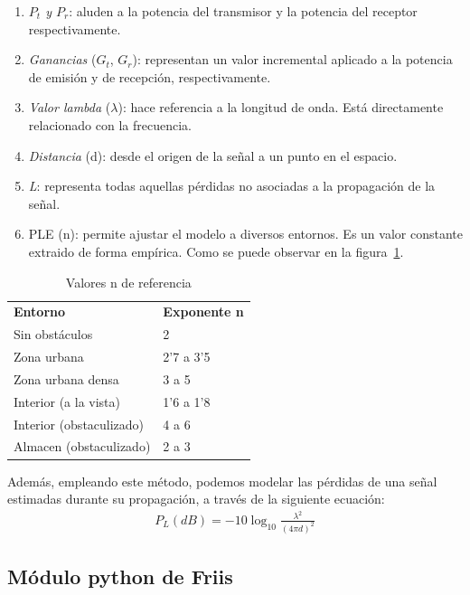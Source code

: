 \begin{enumerate}
    \item \emph{$P_t$ y $P_r$}: aluden a la potencia del transmisor y la potencia del receptor respectivamente.
    \item \emph{Ganancias} ($G_t$, $G_r$): representan un valor incremental aplicado a la potencia de emisión y de recepción, respectivamente.
    \item \emph{Valor lambda} ($\lambda$): hace referencia a la longitud de onda. Está directamente relacionado con la frecuencia.
    \item \emph{Distancia} (d): desde el origen de la señal a un punto en el espacio.
    \item \emph{L}: representa todas aquellas pérdidas no asociadas a la propagación de la señal.
    \item \ac{PLE} (n): permite ajustar el modelo a diversos entornos. Es un valor constante extraido de forma empírica. Como se puede observar en la figura~\ref{table:ple_table}.
\end{enumerate}

\begin{table} [t]
    \centering
    \begin{tabular}{ll}
    \textbf{Entorno}            & \textbf{Exponente n} \\
    Sin obstáculos              & 2 \\
    Zona urbana                 & 2'7 a 3'5\\
    Zona urbana densa           & 3 a 5  \\
    Interior (a la vista)       & 1'6 a 1'8 \\
    Interior (obstaculizado)    & 4 a 6 \\
    Almacen (obstaculizado)     & 2 a 3 \\
    \end{tabular}
    \caption[Valores n de referencia]{Valores n de referencia}
    \label{table:ple_table}
\end{table}

Además, empleando este método, podemos modelar las pérdidas de una señal estimadas durante su propagación, a través de la siguiente ecuación:\\

\begin{align}
    P_L(dB) = -10 \log_{10} \frac{\lambda^2}{(4 \pi d)^2}
\end{align}

\subsection{Módulo python de Friis}
\label{subsec:friis-module}

